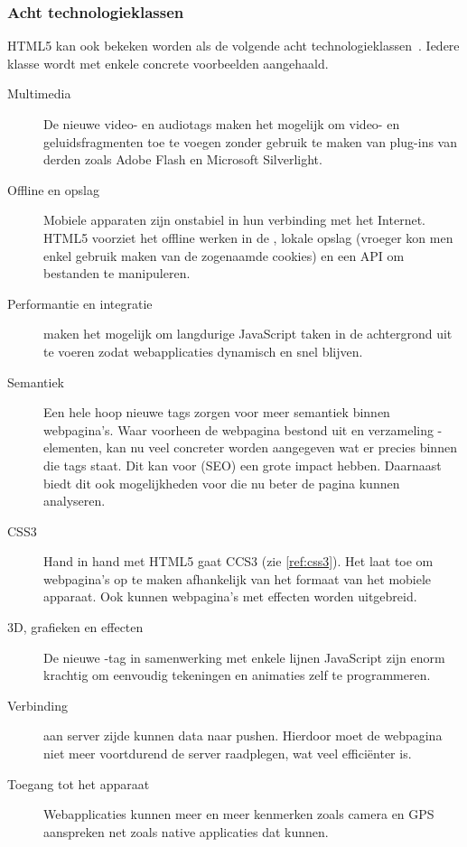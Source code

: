 \subsubsection{Acht technologieklassen}
HTML5 kan ook bekeken worden als de volgende acht technologieklassen~\cite{W3C2012}. 
Iedere klasse wordt met enkele concrete voorbeelden aangehaald.

\begin{description}
\item [Multimedia] De nieuwe video- en audiotags maken het mogelijk om video- en geluidsfragmenten toe te voegen zonder gebruik te maken van plug-ins van derden zoals Adobe Flash en Microsoft Silverlight.

\item [Offline en opslag]  Mobiele apparaten zijn onstabiel in hun verbinding met het Internet. HTML5 voorziet het offline werken in de , lokale opslag (vroeger kon men enkel gebruik maken van de zogenaamde cookies) en een API om bestanden te manipuleren.

\item [Performantie en integratie]   maken het mogelijk om langdurige JavaScript taken in de achtergrond uit te voeren zodat webapplicaties dynamisch en snel blijven.

\item [Semantiek]  Een hele hoop nieuwe tags zorgen voor meer semantiek binnen webpagina's. Waar voorheen de webpagina bestond uit en verzameling -elementen, kan nu veel concreter worden aangegeven wat er precies binnen die tags staat. Dit kan voor  (SEO) een grote impact hebben. Daarnaast biedt dit ook mogelijkheden voor  die nu beter de pagina kunnen analyseren.

\item [CSS3]  Hand in hand met HTML5 gaat CCS3 (zie \ref{ref:css3}). Het laat toe om webpagina's op te maken afhankelijk van het formaat van het mobiele apparaat. Ook kunnen webpagina's met effecten worden uitgebreid. 

\item [3D, grafieken en effecten]  De nieuwe -tag in samenwerking met enkele lijnen JavaScript zijn enorm krachtig om eenvoudig tekeningen en animaties zelf te programmeren.

\item [Verbinding]   aan server zijde kunnen data naar  pushen. Hierdoor moet de webpagina niet meer voortdurend de server raadplegen, wat veel efficiënter is.

\item [Toegang tot het apparaat] Webapplicaties kunnen meer en meer kenmerken zoals camera en GPS aanspreken net zoals native applicaties dat kunnen. 
\end{description}

